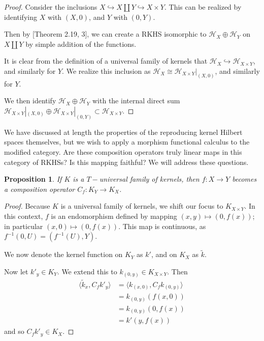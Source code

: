 \documentclass[12pt]{amsart}
\newtheorem{proposition}[theorem]{Proposition}
\theoremstyle{definition}
\numberwithin{equation}{section}
\begin{document}
\begin{proof}
    Consider the inclusions  $X \hookrightarrow X \coprod Y \hookrightarrow X \times Y$. This can be realized by identifying $X$ with $(X, 0)$, and $Y$ with $(0, Y)$. 

    Then by [Theorem 2.19, 3], we can create a RKHS isomorphic to $\mathcal H_X \oplus \mathcal H_Y$ on $X \coprod Y$ by simple addition of the functions. 

    It is clear from the definition of a universal family of kernels that $\mathcal H_X \hookrightarrow \mathcal H_{X \times Y}$, and similarly for $Y$. We realize this inclusion as $\mathcal H_X \cong \mathcal H_{X \times Y}|_{(X, 0)}$, and similarly for $Y$. 

    We then identify $\mathcal H_{X} \oplus \mathcal H_Y$ with the internal direct sum $\mathcal H_{X \times Y}|_{(X, 0)} \oplus \mathcal H_{X \times Y}|_{(0, Y)} \subset \mathcal H_{X \times Y}.$
\end{proof}


We have discussed at length the properties of the reproducing kernel Hilbert spaces themselves, but we wish to apply a morphism functional calculus to the modified category. Are these composition operators truly linear maps in this category of RKHSs? Is this mapping faithful? We will address these questions.

\begin{proposition}\label{between spaces}
    If $K$ is a $T-$universal family of kernels, then $f: X \rightarrow Y$ becomes a composition operator $C_f: K_Y \rightarrow K_X$. 
\end{proposition}
\begin{proof}
    Because $K$ is a universal family of kernels, we shift our focus to $K_{X\times Y}$. In this context, $f$ is an endomorphism defined by mapping $(x, y) \mapsto (0, f(x))$; in particular $(x, 0) \mapsto (0, f(x))$. This map is continuous, as $f^{-1}(0, U) = (f^{-1}(U), Y)$. 

    We now denote the kernel function on $K_Y$ as $k'$, and on $K_X$ as $\tilde k$.

    Now let $k'_y \in K_Y$. We extend this to $k_{(0, y)} \in K_{X\times Y}$. Then \[ \begin{split}\langle \tilde k_x, C_fk'_y \rangle &=\langle k_{(x, 0)} ,C_fk_{(0, y)}\rangle\\& = k_{(0, y)}(f(x, 0))\\&=k_{(0, y)}(0, f(x))\\&= k'(y, f(x))\end{split}\]
    and so $C_fk'_y \in K_X$.
\end{proof}
\end{document}
